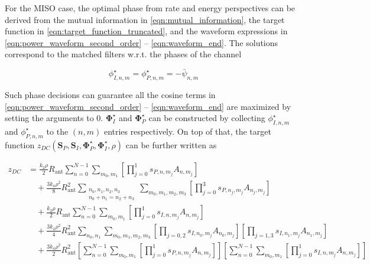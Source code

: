 For the MISO case, the optimal phase from rate and energy perspectives can be derived from the mutual information in \ref{eqn:mutual_information}, the target function in \ref{eqn:target_function_truncated}, and the waveform expressions in \ref{eqn:power_waveform_second_order} -- \ref{eqn:waveform_end}. The solutions correspond to the matched filters w.r.t. the phases of the channel

\begin{equation}\label{eqn:optimal_phases}
  \phi _{I,n,m}^ \star  = \phi _{P,n,m}^ \star  =  - {{\bar \psi }_{n,m}}
\end{equation}

Such phase decisions can guarantee all the cosine terms in \ref{eqn:power_waveform_second_order} -- \ref{eqn:waveform_end} are maximized by setting the arguments to 0. ${\mathbf{\Phi }}_I^ \star $ and ${\mathbf{\Phi }}_P^ \star $ can be constructed by collecting $\phi _{I,n,m}^ \star $ and $\phi _{P,n,m}^ \star $ to the $(n,m)$ entries respectively. On top of that, the target function ${z_{DC}}\left( {{{\mathbf{S}}_P},{{\mathbf{S}}_I},{\mathbf{\Phi }}_P^ \star ,{\mathbf{\Phi }}_I^ \star ,\rho } \right)$ can be further written as

\begin{align}\label{eqn:target_posynomial}
  {z_{DC}} &= \frac{{{k_2}\rho }}{2}{R_{{\text{ant}}}}\sum\limits_{n = 0}^{N - 1} {\sum\limits_{{m_0},{m_1}} {\left[ {\prod\limits_{j = 0}^1 {{s_{P,n,{m_j}}}} {A_{n,{m_j}}}} \right]} } \nonumber \\
   &\quad + \frac{{3{k_4}{\rho ^2}}}{8}R_{{\text{ant}}}^2\sum\limits_{\substack{ {n_0},{n_1},{n_2},{n_3} \\ {n_0} + {n_1} = {n_2} + {n_3} } }  {\sum\limits_{{m_0},{m_1},{m_2},{m_3}} {\left[ {\prod\limits_{j = 0}^3 {{s_{P,{n_j},{m_j}}}{A_{{n_j},{m_j}}}} } \right]} } \nonumber \\
   &\quad + \frac{{{k_2}\rho }}{2}{R_{{\text{ant}}}}\sum\limits_{n = 0}^{N - 1} {\sum\limits_{{m_0},{m_1}} {\left[ {\prod\limits_{j = 0}^1 {{s_{I,n,{m_j}}}} {A_{n,{m_j}}}} \right]} } \nonumber \\
   &\quad + \frac{{3{k_4}{\rho ^2}}}{4}R_{{\text{ant}}}^2\sum\limits_{{n_0},{n_1}} {\sum\limits_{{m_0},{m_1},{m_2},{m_3}} {\left[ {\prod\limits_{j = 0,2} {{s_{I,{n_0},{m_j}}}{A_{{n_0},{m_j}}}} } \right]\left[ {\prod\limits_{j = 1,3} {{s_{I,{n_1},{m_j}}}{A_{{n_1},{m_j}}}} } \right]} } \nonumber \\
   &\quad + \frac{{3{k_4}{\rho ^2}}}{2}R_{\text{ant}}^2\left[ {\sum\limits_{n = 0}^{N - 1} {\sum\limits_{{m_0},{m_1}} {\left[ {\prod\limits_{j = 0}^1 {{s_{P,n,{m_j}}}} {A_{n,{m_j}}}} \right]} } } \right]\left[ {\sum\limits_{n = 0}^{N - 1} {\sum\limits_{{m_0},{m_1}} {\left[ {\prod\limits_{j = 0}^1 {{s_{I,n,{m_j}}}} {A_{n,{m_j}}}} \right]} } } \right]
\end{align}

